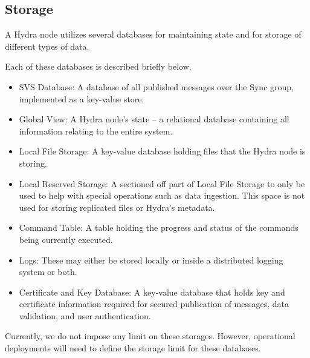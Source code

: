 \subsection{Storage} \label{sec:storage}
A Hydra node utilizes several databases for maintaining state and for storage of different types of data.

Each of these databases is described briefly below.
\begin{itemize}
    \item SVS Database: A database of all published messages over the Sync group, implemented as a key-value store.
    \item Global View: A Hydra node's state -- a relational database containing all information relating to the entire system.
    \item Local File Storage: A key-value database holding files that the Hydra node is storing.
    \item Local Reserved Storage: A sectioned off part of Local File Storage to only be used to help with special operations such as data ingestion. This space is not used for storing replicated files or Hydra's metadata.
    \item Command Table: A table holding the progress and status of the commands being currently executed.
    \item Logs: These may either be stored locally or inside a distributed logging system or both.
    \item Certificate and Key Database: A key-value database that holds key and certificate information required for secured publication of messages, data validation, and user authentication.
\end{itemize}

Currently, we do not impose any limit on these storages. However, operational deployments will need to define the storage limit for these databases.
